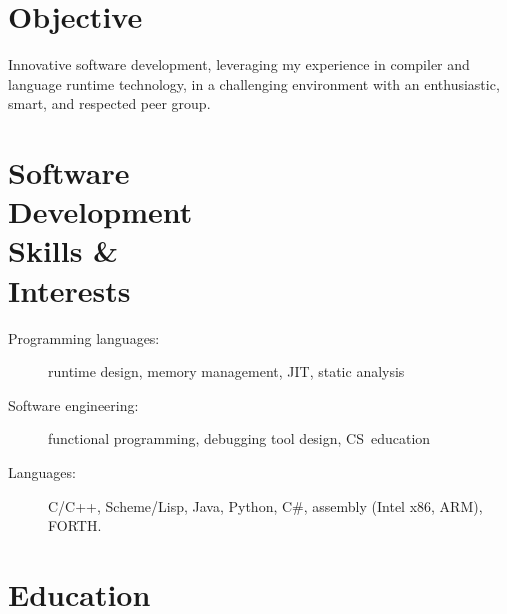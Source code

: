 \documentclass[margin,line,draft]{res}
\def\noneed#1{}
\newcommand{\mysidestyle}{\sc}
\begin{document}
\address{36 rue Fondary, 75015 Paris, France\\phone: +1 857.472.3757\\
e-mail: {\tt felix.klock@gmail.com}
}
\begin{resume}
  \vspace{-7mm}

    \section{\mysidestyle Objective}
    Innovative software development,
    leveraging my experience
    in compiler and language runtime technology,
    in a challenging environment with
    an enthusiastic, smart, and respected peer group.

    \vspace{-4mm}
    \section{\mysidestyle Software\\Development\\Skills \&\\Interests}
    \begin{description}
      \item[\rm Programming languages:] runtime design, memory management, JIT, static analysis
        \vspace{-1ex}
      \item[\rm Software engineering:] functional programming, \noneed{system modeling, }debugging tool design, CS~education%
        \noneed{\\ Programming Language Design: Type and Effect Systems, Syntatic Extension}
        \vspace{-1ex}
      \item[\rm Languages:] C/C++, Scheme/Lisp, Java, Python, C\#, assembly (Intel x86, ARM), FORTH\noneed{, \LaTeXe}.
    \end{description}
    \section{\mysidestyle Education}


\end{resume}
\end{document}

